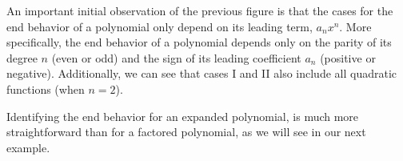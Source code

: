 \documentclass[12pt]{book}
\theoremstyle{definition}
\begin{document}
{\begin{minipage}{1\linewidth}
\begin{center}
\begin{multicols}{2}
\end{multicols}
\end{center}
\end{minipage}
}

An important initial observation of the previous figure is that the cases for the end behavior of a polynomial only depend on its leading term, $a_nx^n$.  More specifically, the end behavior of a polynomial depends only on the parity of its degree $n$ (even or odd) and the sign of its leading coefficient $a_n$ (positive or negative).  Additionally, we can see that cases I and II also include all quadratic functions (when $n=2$).
\par
Identifying the end behavior for an expanded polynomial, is much more straightforward than for a factored polynomial, as we will see in our next example.
\end{document}
